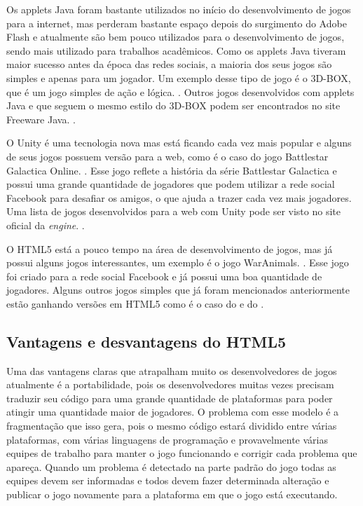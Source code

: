 Os applets Java foram bastante utilizados no início do desenvolvimento
de jogos para a internet, mas perderam
bastante espaço depois do surgimento do Adobe Flash e atualmente
são bem pouco utilizados para o desenvolvimento de
jogos, sendo mais utilizado para trabalhos acadêmicos.
Como os applets Java tiveram maior sucesso antes da época das redes
sociais, a maioria dos seus jogos são simples e apenas para um
jogador. Um exemplo desse tipo de jogo é o 3D-BOX,
que é um jogo simples de ação e lógica. \cite{website:3dbox}.
Outros jogos desenvolvidos com applets Java e que seguem o mesmo estilo do 3D-BOX
podem ser encontrados no site Freeware Java. \cite{website:freewarejava}.

O Unity é uma tecnologia nova mas está ficando cada vez mais popular e alguns de seus jogos
possuem versão para a web, como é o caso do jogo Battlestar Galactica
Online. \cite{website:unitybattlestargalactica}. Esse jogo reflete a
história da série Battlestar Galactica e possui uma grande quantidade
de jogadores que podem utilizar a rede social Facebook para desafiar
os amigos, o que ajuda a trazer cada vez mais jogadores.
Uma lista de jogos desenvolvidos para a web com Unity pode ser visto
no site oficial da \textit{engine}. \cite{website:unity3dwebgames}.

O HTML5 está a pouco tempo na área de desenvolvimento de jogos, mas já
possui alguns jogos interessantes, um exemplo é o jogo
WarAnimals. \cite{website:waranimals}. Esse jogo foi criado para a rede social
Facebook e já possui uma boa quantidade de jogadores. Alguns outros
jogos simples que já foram mencionados anteriormente estão ganhando versões em HTML5
como é o caso do  e do
.


\subsection{Vantagens e desvantagens do HTML5}

Uma das vantagens claras que atrapalham muito os desenvolvedores de
jogos atualmente é a portabilidade, pois os desenvolvedores muitas
vezes precisam traduzir seu código para uma grande quantidade de
plataformas para poder atingir uma quantidade maior de jogadores. O
problema com esse modelo é a fragmentação que isso gera, pois o mesmo
código estará dividido entre várias plataformas, com várias linguagens
de programação e provavelmente várias equipes de trabalho para manter
o jogo funcionando e corrigir cada problema que apareça. Quando um
problema é detectado na parte padrão do jogo todas as equipes devem
ser informadas e todos devem fazer determinada alteração e publicar o
jogo novamente para a plataforma em que o jogo está executando.

